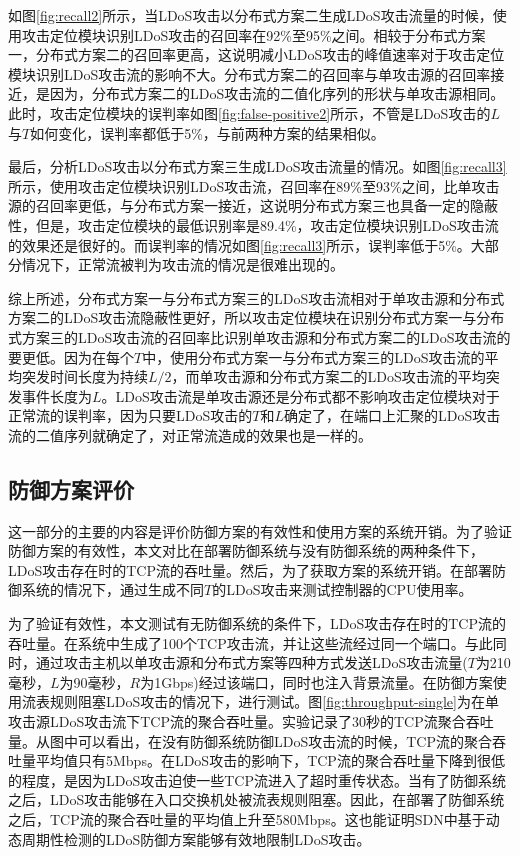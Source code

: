 如图\ref{fig:recall2}所示，当LDoS攻击以分布式方案二生成LDoS攻击流量的时候，使用攻击定位模块识别LDoS攻击的召回率在92\%至95\%之间。相较于分布式方案一，分布式方案二的召回率更高，这说明减小LDoS攻击的峰值速率对于攻击定位模块识别LDoS攻击流的影响不大。分布式方案二的召回率与单攻击源的召回率接近，是因为，分布式方案二的LDoS攻击流的二值化序列的形状与单攻击源相同。此时，攻击定位模块的误判率如图\ref{fig:false-positive2}所示，不管是LDoS攻击的$L$与$T$如何变化，误判率都低于5\%，与前两种方案的结果相似。

最后，分析LDoS攻击以分布式方案三生成LDoS攻击流量的情况。如图\ref{fig:recall3}所示，使用攻击定位模块识别LDoS攻击流，召回率在89\%至93\%之间，比单攻击源的召回率更低，与分布式方案一接近，这说明分布式方案三也具备一定的隐蔽性，但是，攻击定位模块的最低识别率是89.4\%，攻击定位模块识别LDoS攻击流的效果还是很好的。而误判率的情况如图\ref{fig:recall3}所示，误判率低于5\%。大部分情况下，正常流被判为攻击流的情况是很难出现的。

综上所述，分布式方案一与分布式方案三的LDoS攻击流相对于单攻击源和分布式方案二的LDoS攻击流隐蔽性更好，所以攻击定位模块在识别分布式方案一与分布式方案三的LDoS攻击流的召回率比识别单攻击源和分布式方案二的LDoS攻击流的要更低。因为在每个$T$中，使用分布式方案一与分布式方案三的LDoS攻击流的平均突发时间长度为持续$L/2$，而单攻击源和分布式方案二的LDoS攻击流的平均突发事件长度为$L$。LDoS攻击流是单攻击源还是分布式都不影响攻击定位模块对于正常流的误判率，因为只要LDoS攻击的$T$和$L$确定了，在端口上汇聚的LDoS攻击流的二值序列就确定了，对正常流造成的效果也是一样的。


\subsection{防御方案评价}
\label{chap05:evaluaion}

这一部分的主要的内容是评价防御方案的有效性和使用方案的系统开销。为了验证防御方案的有效性，本文对比在部署防御系统与没有防御系统的两种条件下，LDoS攻击存在时的TCP流的吞吐量。然后，为了获取方案的系统开销。在部署防御系统的情况下，通过生成不同$T$的LDoS攻击来测试控制器的CPU使用率。

为了验证有效性，本文测试有无防御系统的条件下，LDoS攻击存在时的TCP流的吞吐量。在系统中生成了100个TCP攻击流，并让这些流经过同一个端口。与此同时，通过攻击主机以单攻击源和分布式方案等四种方式发送LDoS攻击流量($T$为210毫秒，$L$为90毫秒，$R$为1Gbps)经过该端口，同时也注入背景流量。在防御方案使用流表规则阻塞LDoS攻击的情况下，进行测试。图\ref{fig:throughput-single}为在单攻击源LDoS攻击流下TCP流的聚合吞吐量。实验记录了30秒的TCP流聚合吞吐量。从图中可以看出，在没有防御系统防御LDoS攻击流的时候，TCP流的聚合吞吐量平均值只有5Mbps。在LDoS攻击的影响下，TCP流的聚合吞吐量下降到很低的程度，是因为LDoS攻击迫使一些TCP流进入了超时重传状态。当有了防御系统之后，LDoS攻击能够在入口交换机处被流表规则阻塞。因此，在部署了防御系统之后，TCP流的聚合吞吐量的平均值上升至580Mbps。这也能证明SDN中基于动态周期性检测的LDoS防御方案能够有效地限制LDoS攻击。

